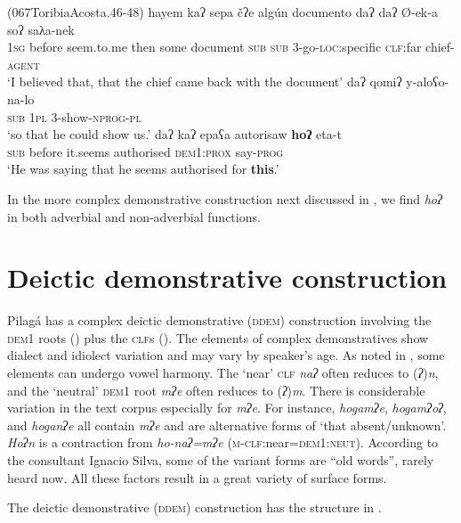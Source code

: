 \documentclass[output=paper,colorlinks,citecolor=brown]{langscibook}
\begin{document}
\ea\label{ex:payne:23} (067ToribiaAcosta.46-48)
\ea\label{ex:payne:23a}
\gll   hayem  kaʔ  sepa  čʔe  algún  documento daʔ  daʔ  Ø-ek-a  soʔ  saλa-nek\\
 \textsc{1sg} before seem.to.me then some  document \textsc{sub} \textsc{sub} \textsc{3}-go-\textsc{loc}:specific  \textsc{clf}:far chief-\textsc{agent}\\
\glt ‘I believed that, that the chief came back with the document’
\ex\label{ex:payne:23b}
\gll   daʔ    qomiʔ  y-aloʕo-na-lo\\
\textsc{sub}  \textsc{1pl}  \textsc{3}-show-\textsc{nprog-pl}\\
\glt ‘so that he could show us.’
\ex\label{ex:payne:23c}
\gll   daʔ    kaʔ  epaʕa  autorisaw  \textbf{hoʔ}    eta-t\\
  \textsc{sub} before it.seems authorised \textsc{dem1:prox} say-\textsc{prog}\\
\glt ‘He was saying that he seems authorised for \textbf{this}.’ 
\z
\z

In the more complex demonstrative construction next discussed in , we find \textit{hoʔ} in both adverbial and non-adverbial functions.

\section{Deictic demonstrative construction}\label{sec:payne:5}

Pilagá has a complex deictic demonstrative (\textsc{ddem}) construction involving the \textsc{dem1} roots () plus the \textsc{clf}s (). The elements of complex demonstratives show dialect and idiolect variation and may vary by speaker’s age. As noted in , some elements can undergo vowel harmony. The ‘near’ \textsc{clf} \textit{naʔ} often reduces to (\textit{ʔ})\textit{n}, and the ‘neutral’ \textsc{dem1} root \textit{mʔe} often reduces to (\textit{ʔ})\textit{m}. There is considerable variation in the text corpus especially for \textit{mʔe}. For instance, \textit{hogamʔe}, \textit{hogamʔoʔ}, and \textit{hoganʔe} all contain \textit{mʔe} and are alternative forms of ‘that absent/unknown’. \textit{Hoʔn} is a contraction from \textit{ho-naʔ=mʔe} (\textsc{m-clf}:near=\textsc{dem1:neut}). According to the consultant Ignacio Silva, some of the variant forms are “old words”, rarely heard now. All these factors result in a great variety of surface forms.

The deictic demonstrative (\textsc{ddem}) construction has the structure in .
\end{document}
